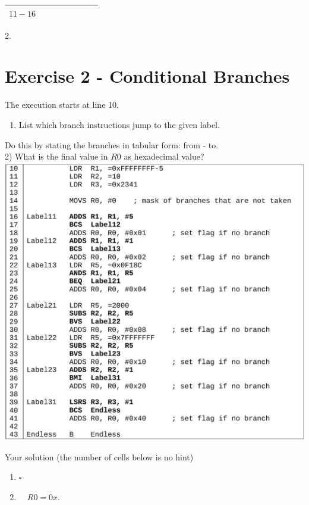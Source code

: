 \begin{center}
\begin{tabular}{|l|l|l|l|l|l|l|l|}
\hline
$11-16$ &  &  &  &  &  &  &  \\
\hline
\end{tabular}
\end{center}

2.

\section*{Exercise 2 - Conditional Branches}
The execution starts at line 10.

\begin{enumerate}
  \item List which branch instructions jump to the given label.
\end{enumerate}

Do this by stating the branches in tabular form: from - to.\\
2) What is the final value in $R 0$ as hexadecimal value?\\
\includegraphics[width=\linewidth]{images/2025_01_02_9902c2d2685de638ef73g-3}

Your solution (the number of cells below is no hint)

\begin{enumerate}
  \item $\square$
  \item $\quad R 0=0 x$. $\qquad$
\end{enumerate}

